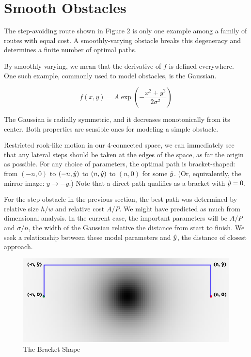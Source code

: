 \section{Smooth Obstacles}
The step-avoiding route shown in Figure 2 is only one example among a family of routes with equal cost. A smoothly-varying obstacle breaks this degeneracy and determines a finite number of optimal paths.

By smoothly-varying, we mean that the derivative of $f$ is defined everywhere. One such example, commonly used to model obstacles, is the Gaussian.

\begin{equation}
f(x, y) = A \exp\left(-\displaystyle\frac{x^2+y^2}{2\sigma^2}\right)
\end{equation}

The Gaussian is radially symmetric, and it decreases monotonically from its center. Both properties are sensible ones for modeling a simple obstacle.

Restricted rook-like motion in our 4-connected space, we can immediately see that any lateral steps should  be taken at the edges of the space, as far the origin as possible. For any choice of parameters, the optimal path is bracket-shaped: from $(-n,0)$ to $(-n, \hat{y})$ to $(n, \hat{y})$ to $(n,0)$ for some $\hat{y}$. (Or, equivalently, the mirror image: $y \rightarrow -y$.) Note that a direct path qualifies as a bracket with $\hat{y}=0$.

For the step obstacle in the previous section, the best path was determined by relative size $h/w$ and relative cost $A/P$. We might have predicted as much from dimensional analysis. In the current case, the important parameters will be $A/P$ and $\sigma/n$, the width of the Gaussian relative the distance from start to finish. We seek a relationship between these model parameters and $\hat{y}$, the distance of closest approach.


\begin{figure}
\includegraphics[width=\columnwidth]{graphix/bracket.png}
\caption{The Bracket Shape}
\label{fig:bracket}
\end{figure}